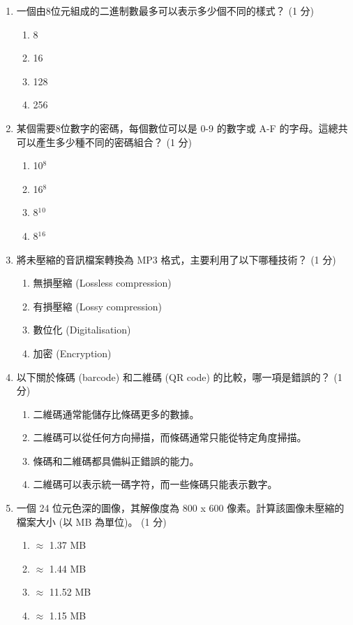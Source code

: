 \documentclass[12pt,a4paper]{article}
\begin{document}
\begin{enumerate}
    \item 一個由8位元組成的二進制數最多可以表示多少個不同的樣式？ (1 分)
    \begin{enumerate}[label=\Alph*.]
        \item 8
        \item 16
        \item 128
        \item 256
    \end{enumerate}
    
    \item 某個需要8位數字的密碼，每個數位可以是 0-9 的數字或 A-F 的字母。這總共可以產生多少種不同的密碼組合？ (1 分)
    \begin{enumerate}[label=\Alph*.]
        \item 10$^{8}$
        \item 16$^{8}$
        \item 8$^{1}$$^{0}$
        \item 8$^{1}$$^{6}$
    \end{enumerate}
    
    \item 將未壓縮的音訊檔案轉換為 MP3 格式，主要利用了以下哪種技術？ (1 分)
    \begin{enumerate}[label=\Alph*.]
        \item 無損壓縮 (Lossless compression)
        \item 有損壓縮 (Lossy compression)
        \item 數位化 (Digitalisation)
        \item 加密 (Encryption)
    \end{enumerate}
    
    \item 以下關於條碼 (barcode) 和二維碼 (QR code) 的比較，哪一項是錯誤的？ (1 分)
    \begin{enumerate}[label=\Alph*.]
        \item 二維碼通常能儲存比條碼更多的數據。
        \item 二維碼可以從任何方向掃描，而條碼通常只能從特定角度掃描。
        \item 條碼和二維碼都具備糾正錯誤的能力。
        \item 二維碼可以表示統一碼字符，而一些條碼只能表示數字。
    \end{enumerate}
    
    \item 一個 24 位元色深的圖像，其解像度為 800 x 600 像素。計算該圖像未壓縮的檔案大小 (以 MB 為單位)。 (1 分)
    \begin{enumerate}[label=\Alph*.]
        \item $\approx$ 1.37 MB
        \item $\approx$ 1.44 MB
        \item $\approx$ 11.52 MB
        \item $\approx$ 1.15 MB
    \end{enumerate}
    

\end{enumerate}
\end{document}
